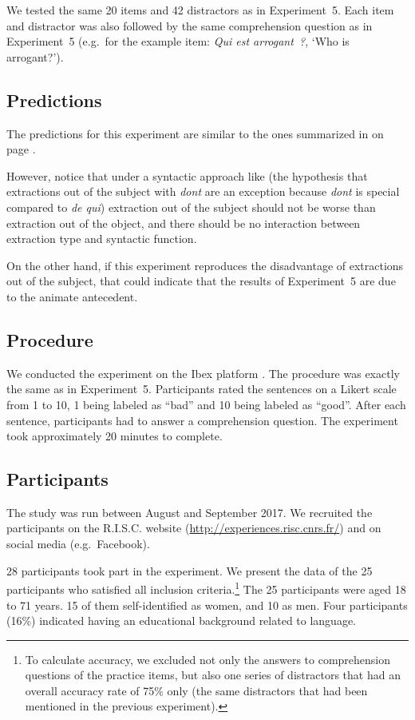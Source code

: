 We tested the same 20 items and 42 distractors as in Experiment~5. Each item and distractor was also followed by the same comprehension question as in Experiment~5 (e.g.\ for the example item: \emph{Qui est arrogant~?}, `Who is arrogant?').

\subsection{Predictions} 

The predictions for this experiment are similar to the ones summarized in  on page \pageref{tab:exp05-predictions}. 

However, notice that under a syntactic approach like   (the hypothesis that extractions out of the subject with \emph{dont} are an exception because \emph{dont} is special compared to \emph{de qui}) extraction out of the subject should not be worse than extraction out of the object, and there should be no interaction between extraction type and syntactic function.

On the other hand, if this experiment reproduces the disadvantage of extractions out of the subject, that could indicate that the results of Experiment~5 are due to the animate antecedent.

\subsection{Procedure}

We conducted the experiment on the Ibex platform \citep{Ibex}. The procedure was exactly the same as in Experiment~5. Participants rated the sentences on a Likert scale from 1 to 10, 1 being labeled as ``bad'' and 10 being labeled as ``good''. After each sentence, participants had to answer a comprehension question.
The experiment took approximately 20 minutes to complete.

\subsection{Participants}

The study was run between August and September 2017. We recruited the participants on the R.I.S.C. website (\url{http://experiences.risc.cnrs.fr/}) and on social media (e.g.\ Facebook).

28 participants took part in the experiment. We present the data of the 25 participants who satisfied all inclusion criteria.{\footnote{To calculate accuracy, we excluded not only the answers to comprehension questions of the practice items, but also one series of distractors that had an overall accuracy rate of 75\% only (the same distractors that had been mentioned in the previous experiment).}}
The 25 participants were aged 18 to 71 years. 15 of them self-identified as women, and 10 as men. Four participants (16\%) indicated having an educational background related to language.

